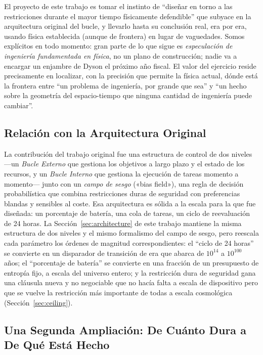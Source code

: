 \documentclass[11pt]{article}
\begin{document}
El proyecto de este trabajo es tomar el instinto de ``diseñar en torno a las restricciones durante el mayor tiempo físicamente defendible'' que subyace en la arquitectura original del bucle, y llevarlo hasta su conclusión real, era por era, usando física establecida (aunque de frontera) en lugar de vaguedades. Somos explícitos en todo momento: gran parte de lo que sigue es \emph{especulación de ingeniería fundamentada en física}, no un plano de construcción; nadie va a encargar un enjambre de Dyson el próximo año fiscal. El valor del ejercicio reside precisamente en localizar, con la precisión que permite la física actual, dónde está la frontera entre ``un problema de ingeniería, por grande que sea'' y ``un hecho sobre la geometría del espacio-tiempo que ninguna cantidad de ingeniería puede cambiar''.

\subsection{Relación con la Arquitectura Original}

La contribución del trabajo original fue una estructura de control de dos niveles —un \emph{Bucle Externo} que gestiona los objetivos a largo plazo y el estado de los recursos, y un \emph{Bucle Interno} que gestiona la ejecución de tareas momento a momento— junto con un \emph{campo de sesgo} («bias field»), una regla de decisión probabilística que combina restricciones duras de seguridad con preferencias blandas y sensibles al coste. Esa arquitectura es sólida a la escala para la que fue diseñada: un porcentaje de batería, una cola de tareas, un ciclo de reevaluación de 24 horas. La Sección~\ref{sec:architecture} de este trabajo mantiene la misma estructura de dos niveles y el mismo formalismo del campo de sesgo, pero reescala cada parámetro los órdenes de magnitud correspondientes: el ``ciclo de 24 horas'' se convierte en un disparador de transición de era que abarca de $10^{14}$ a $10^{100}$ años; el ``porcentaje de batería'' se convierte en una fracción de un presupuesto de entropía fijo, a escala del universo entero; y la restricción dura de seguridad gana una cláusula nueva y no negociable que no hacía falta a escala de dispositivo pero que se vuelve la restricción más importante de todas a escala cosmológica (Sección~\ref{sec:ceiling}).

\subsection{Una Segunda Ampliación: De Cuánto Dura a De Qué Está Hecho}
\end{document}
